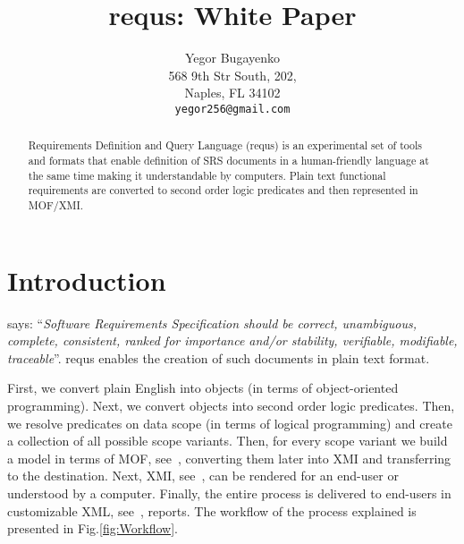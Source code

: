 \documentclass[12pt,oneside,letterpaper]{article}
\begin{document}
    \raggedright
    \setlength{\parindent}{0pt}
    \setlength{\parskip}{1em}
    \newcommand{\type}[1]{\colorbox{lightgray}{\texttt{#1}}}
    \newenvironment{maths}
        {\vspace*{0.5em}\begin{tabular}{l>{\raggedright\arraybackslash}p{20em}}}
        {\end{tabular}\vspace*{1em}}
    \title{requs: White Paper}
    \author{
        Yegor Bugayenko\\
        568 9th Str South, 202, \\
        Naples, FL 34102\\
        \texttt{yegor256@gmail.com}
    }
    \maketitle
    \begin{abstract}
        Requirements Definition and Query Language (requs) is
        an experimental set of tools and formats that enable definition of
        SRS documents in a
        human-friendly language at the same time making it understandable
        by computers. Plain text functional requirements are converted to
        second order logic predicates and then represented in MOF/XMI.
    \end{abstract}




\section{Introduction}

    \citet{ieee830} says: ``\emph{Software Requirements Specification should be
    correct, unambiguous, complete, consistent, ranked for importance and/or stability,
    verifiable, modifiable, traceable}''. requs enables the creation
    of such documents in plain text format.

    First, we convert plain English into objects (in terms of object-oriented
    programming). Next, we convert objects into second order logic predicates.
    Then, we resolve predicates on data scope (in terms of logical programming)
    and create a collection of all possible scope variants. Then, for every
    scope variant we build a model in terms of MOF, see~\citet{mof2}, converting them later
    into XMI and transferring to the destination. Next, XMI, see~\citet{mof-to-xmi}, can be rendered
    for an end-user or understood by a computer. Finally, the entire process
    is delivered to end-users in customizable XML, see~\citet{xml}, reports.
    The workflow of the process explained is presented in Fig.\ref{fig:Workflow}.
\end{document}
